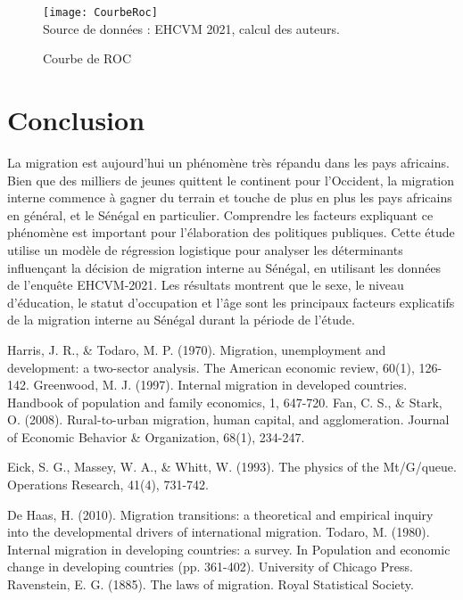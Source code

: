 \documentclass[a4paper,12pt]{article}
\begin{document}
\begin{figure}[!htp]
	\centering
	\caption{Courbe de ROC}
	\texttt{[image: CourbeRoc]}\\
	Source de données : EHCVM 2021, calcul des auteurs. 
\end{figure}

\newpage 


\section*{Conclusion}

La migration est aujourd’hui un phénomène très répandu dans les pays africains. Bien que des milliers de jeunes quittent le continent pour l’Occident, la migration interne commence à gagner du terrain et touche de plus en plus les pays africains en général, et le Sénégal en particulier. Comprendre les facteurs expliquant ce phénomène est important pour l’élaboration des politiques publiques. Cette étude utilise un modèle de régression logistique pour analyser les déterminants influençant la décision de migration interne au Sénégal, en utilisant les données de l’enquête EHCVM-2021. Les résultats montrent que le sexe, le niveau d’éducation, le statut d’occupation et l’âge sont les principaux facteurs explicatifs de la migration interne au Sénégal durant la période de l’étude.


\newpage

	\begin{thebibliography}{10}
Harris, J. R., \& Todaro, M. P. (1970). Migration, unemployment and development: a two-sector analysis. The American economic review, 60(1), 126-142.
Greenwood, M. J. (1997). Internal migration in developed countries. Handbook of population and family economics, 1, 647-720.
Fan, C. S., \& Stark, O. (2008). Rural-to-urban migration, human capital, and agglomeration. Journal of Economic Behavior \& Organization, 68(1), 234-247.
	
Eick, S. G., Massey, W. A., \& Whitt, W. (1993). The physics of the Mt/G/queue. Operations Research, 41(4), 731-742.
	
De Haas, H. (2010). Migration transitions: a theoretical and empirical inquiry into the developmental drivers of international migration.
Todaro, M. (1980). Internal migration in developing countries: a survey. In Population and economic change in developing countries (pp. 361-402). University of Chicago Press.
Ravenstein, E. G. (1885). The laws of migration. Royal Statistical Society.
\end{thebibliography}
\end{document}
